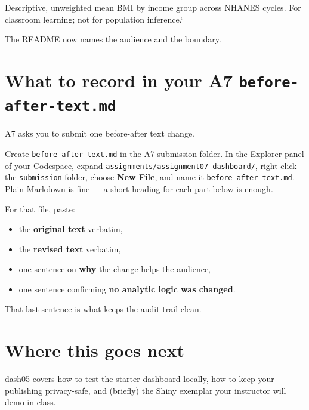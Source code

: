 \documentclass[
  letterpaper,
  DIV=11,
  numbers=noendperiod,
  oneside]{scrreprt}
\providecommand{\tightlist}{%
  \setlength{\itemsep}{0pt}\setlength{\parskip}{0pt}}
\begin{document}
Descriptive, unweighted mean BMI by income group across NHANES cycles.
For classroom learning; not for population inference.`

The README now names the audience and the boundary.

\section*{\texorpdfstring{What to record in your A7
\texttt{before-after-text.md}}{What to record in your A7 before-after-text.md}}\label{what-to-record-in-your-a7-before-after-text.md}


A7 asks you to submit one before-after text change.

Create \texttt{before-after-text.md} in the A7 submission folder. In the
Explorer panel of your Codespace, expand
\texttt{assignments/assignment07-dashboard/}, right-click the
\texttt{submission} folder, choose \textbf{New File}, and name it
\texttt{before-after-text.md}. Plain Markdown is fine --- a short
heading for each part below is enough.

For that file, paste:

\begin{itemize}
\tightlist
\item
  the \textbf{original text} verbatim,
\item
  the \textbf{revised text} verbatim,
\item
  one sentence on \textbf{why} the change helps the audience,
\item
  one sentence confirming \textbf{no analytic logic was changed}.
\end{itemize}

That last sentence is what keeps the audit trail clean.

\section*{Where this goes next}\label{where-this-goes-next-17}


\href{dash05-testing-privacy-and-shiny-demo.qmd}{dash05} covers how to
test the starter dashboard locally, how to keep your publishing
privacy-safe, and (briefly) the Shiny exemplar your instructor will demo
in class.
\end{document}
